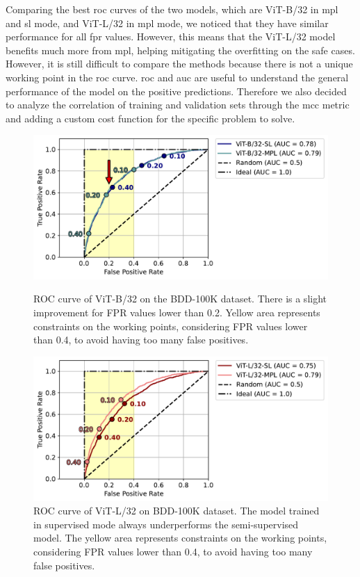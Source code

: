 Comparing the best \ac{roc} curves of the two models, which are ViT-B/32 in 
\acs{mpl} and \acs{sl} mode, and ViT-L/32 in \acs{mpl} mode, we noticed that 
they have similar performance for all \acs{fpr} values. However, this means that 
the ViT-L/32 model benefits much more from \acs{mpl}, helping mitigating the 
overfitting on the safe cases. However, it is still difficult to compare the 
methods because there is not a unique working point in the \ac{roc} curve. 
\acs{roc} and \acs{auc} are useful to understand the general performance of 
the model on the positive predictions. Therefore we also decided to analyze 
the correlation of training and validation sets through the \acf{mcc} metric and 
adding a custom cost function for the specific problem to solve.
\begin{figure}[p]
    \newpage
    \centering
    \includegraphics[width=\textwidth]{images/bdd100k/training/ViT-B32/roc-auc.pdf}
    \caption[ROC curve of ViT-B/32 on the BDD-100K dataset]
    {ROC curve of ViT-B/32 on the BDD-100K dataset. There is a slight improvement 
    for FPR values lower than 0.2. Yellow area represents constraints on the working 
    points, considering FPR values lower than 0.4, to avoid having too many false 
    positives.}
    \label{fig:roc_vitb32}
    \vspace{2cm}
    \includegraphics[width=\textwidth]{images/bdd100k/training/ViT-L32/roc-auc.pdf}
    \caption[ROC curve of ViT-L/32 on the BDD-100K dataset.]
    {ROC curve of ViT-L/32 on BDD-100K dataset. The model trained in supervised 
    mode always underperforms the semi-supervised model.
    The yellow area represents constraints on the working points, considering 
    FPR values lower than 0.4, to avoid having too many false positives.}
    \label{fig:roc_vitl32}
\end{figure}

